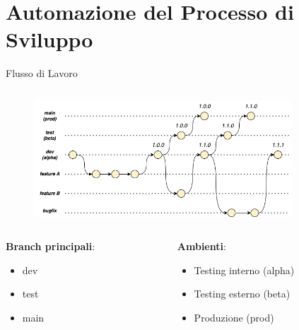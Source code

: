 
\section{Automazione del Processo di Sviluppo}

\begin{frame}{Flusso di Lavoro}
    \begin{columns}[onlytextwidth]
        \begin{column}{0.95\textwidth}
            \begin{figure}[H]
                \includegraphics[width=0.9\textwidth]{img/branching-model.png}
            \end{figure}
        \end{column}
        \begin{column}{0.05\textwidth}
        \end{column}
    \end{columns}
    \vspace{5mm}
    \begin{columns}[onlytextwidth]
        \begin{column}{0.4\textwidth}
            \textbf{Branch principali}:
            \begin{itemize}
                \item dev
                \item test
                \item main
            \end{itemize}
        \end{column}
        \begin{column}{0.4\textwidth}
            \textbf{Ambienti}:
            \begin{itemize}
                \item Testing interno (alpha)
                \item Testing esterno (beta)
                \item Produzione (prod)
            \end{itemize}
        \end{column}
    \end{columns}
\end{frame}

